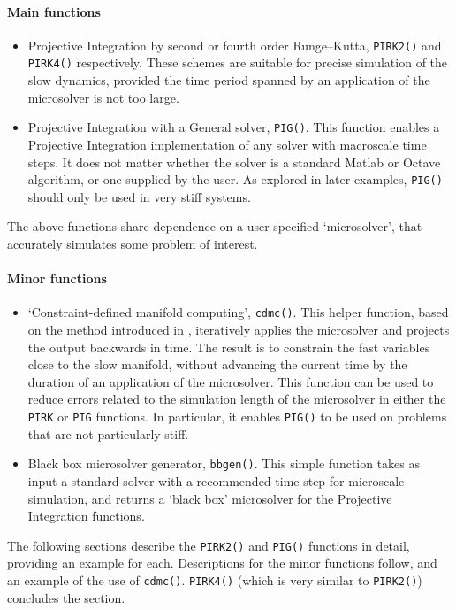 \begin{body}
\paragraph{Main functions}
\begin{itemize}
\item Projective Integration by second or fourth order Runge--Kutta, \verb|PIRK2()| and \verb|PIRK4()| respectively.
These schemes are suitable for precise simulation of the slow dynamics, provided the time period spanned by an application of the microsolver is not too large.
\item Projective Integration with a General solver, \verb|PIG()|.
This function enables a Projective Integration implementation of any solver with macroscale time steps.
It does not matter whether the solver is a standard Matlab or Octave algorithm, or one supplied by the user.
As explored in later examples, \verb|PIG()| should only be used in very stiff systems. 
\end{itemize}
The above functions share dependence on a user-specified `microsolver', that accurately simulates some problem of interest. 
\paragraph{Minor functions}
\begin{itemize}
\item `Constraint-defined manifold computing', \verb|cdmc()|.
This helper function, based on the method introduced in \cite{GearKevrekidis05},  iteratively applies the microsolver and projects the output backwards in time.
The result is to constrain the fast variables close to the slow manifold, without advancing the current time by the duration of an application of the microsolver.
This function can be used to reduce errors related to the simulation length of the microsolver in either the \verb|PIRK| or \verb|PIG| functions.
In particular, it enables \verb|PIG()| to be used on problems that are not particularly stiff.
\item Black box microsolver generator, \verb|bbgen()|.
This simple function takes as input a standard solver with a recommended time step for microscale simulation, and returns a `black box' microsolver for the Projective Integration functions.
\end{itemize}

The following sections describe the \verb|PIRK2()| and \verb|PIG()| functions in detail, providing an example for each.
Descriptions for the minor functions follow, and an example of the use of \verb|cdmc()|.
\verb|PIRK4()| (which is very similar to \verb|PIRK2()|) concludes the section.

\end{body}



